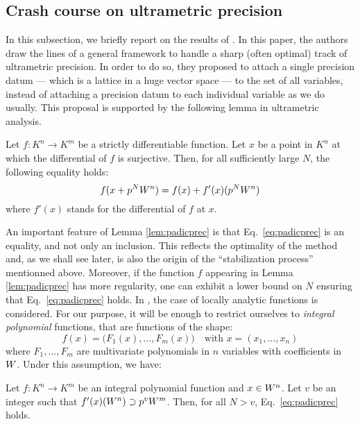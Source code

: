 \documentclass{sig-alternate}
\begin{document}
\subsection{Crash course on ultrametric precision}

In this subsection, we briefly report on the results of \cite{padicprec}. In this 
paper, the authors draw the lines of a general framework to handle a 
sharp (often optimal) track of ultrametric precision. In order to do so, 
they proposed to attach a single precision datum --- which is a lattice 
in a huge vector space --- to the set of all variables, instead of 
attaching a precision datum to each individual variable as we do 
usually. This proposal is supported by the following lemma in ultrametric
analysis.

\begin{lem}
\label{lem:padicprec}
Let $f : K^n \to K^m$ be a strictly differentiable function. Let $x$
be a point in $K^n$ at which the differential of $f$ is surjective.
Then, for all sufficiently large $N$, the following equality holds:
\begin{equation}
\label{eq:padicprec}
f(x + p^N W^n) = f(x) + f'(x)(p^N W^n)
\end{equation}
where $f'(x)$ stands for the differential of $f$ at $x$.
\end{lem}

An important feature of Lemma \ref{lem:padicprec} is that 
Eq.~\eqref{eq:padicprec} is an equality, and not only an inclusion. 
This reflects the optimality of the method and, as we shall see later, 
is also the origin of the ``stabilization process'' mentionned above.
Moreover, if the function $f$ appearing in Lemma \ref{lem:padicprec} 
has more regularity, one can exhibit a lower bound on $N$ ensuring
that Eq.~\eqref{eq:padicprec} holds. In \cite{padicprec}, the case of locally 
analytic functions is considered. For our purpose, it will be enough 
to restrict ourselves to \emph{integral polynomial} functions, that
are functions of the shape:
$$f(x) = \big(F_1(x), \ldots, F_m(x)\big)
\quad \text{with } x = (x_1, \ldots, x_n)$$
where $F_1, \ldots, F_m$ are multivariate polynomials in $n$ variables
with coefficients in $W$. Under this assumption, we have:

\begin{prop}
\label{prop:padicprec}
Let $f : K^n \to K^m$ be an integral polynomial function and $x \in
W^n$. Let $v$ be an integer such that $f'(x)(W^n) \supset p^v W^m$.
Then, for all $N > v$, Eq.~\eqref{eq:padicprec} holds.
\end{prop}
\end{document}
